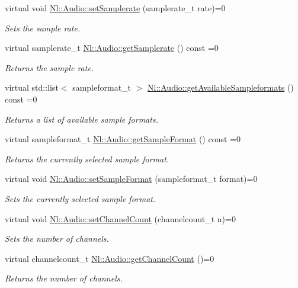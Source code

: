 \begin{DoxyCompactItemize}
virtual void \hyperlink{group__Audio_ga4aa2440aca1c97e4776c789432f37306}{Nl\-::\-Audio\-::set\-Samplerate} (samplerate\-\_\-t rate)=0
\begin{DoxyCompactList}\small\item\em Sets the sample rate. \end{DoxyCompactList}\item 
virtual samplerate\-\_\-t \hyperlink{group__Audio_ga43cd4e1ad7d5b2ff9adc614d31ecd2c8}{Nl\-::\-Audio\-::get\-Samplerate} () const =0
\begin{DoxyCompactList}\small\item\em Returns the sample rate. \end{DoxyCompactList}\item 
virtual std\-::list$<$ sampleformat\-\_\-t $>$ \hyperlink{group__Audio_gab75bfef4a7b8cb95fd5e428a9dd2a19f}{Nl\-::\-Audio\-::get\-Available\-Sampleformats} () const =0
\begin{DoxyCompactList}\small\item\em Returns a list of available sample formats. \end{DoxyCompactList}\item 
virtual sampleformat\-\_\-t \hyperlink{group__Audio_gadb6b16848b659bb3e655cd101242f735}{Nl\-::\-Audio\-::get\-Sample\-Format} () const =0
\begin{DoxyCompactList}\small\item\em Returns the currently selected sample format. \end{DoxyCompactList}\item 
virtual void \hyperlink{group__Audio_ga60ca413bb266d807fdd99c4aa8bb8881}{Nl\-::\-Audio\-::set\-Sample\-Format} (sampleformat\-\_\-t format)=0
\begin{DoxyCompactList}\small\item\em Sets the currently selected sample format. \end{DoxyCompactList}\item 
virtual void \hyperlink{group__Audio_ga2c47e7835c7a17389fbfc467d8d5cb72}{Nl\-::\-Audio\-::set\-Channel\-Count} (channelcount\-\_\-t n)=0
\begin{DoxyCompactList}\small\item\em Sets the number of channels. \end{DoxyCompactList}\item 
virtual channelcount\-\_\-t \hyperlink{group__Audio_ga9acab6c6cdb76c81a3d53e2505ef407a}{Nl\-::\-Audio\-::get\-Channel\-Count} ()=0
\begin{DoxyCompactList}\small\item\em Returns the number of channels. \end{DoxyCompactList}\item 

\end{DoxyCompactItemize}
